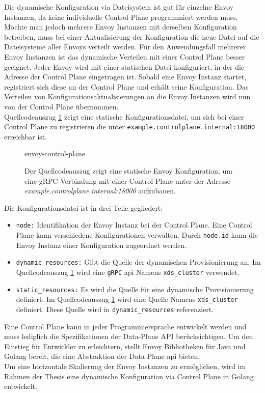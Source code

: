 Die dynamische Konfiguration via Dateisystem ist gut für einzelne Envoy Instanzen, da keine individuelle Control Plane programmiert werden muss.
Möchte man jedoch mehrere Envoy Instanzen mit derselben Konfiguration betreiben, muss bei einer Aktualisierung der Konfiguration die neue Datei auf die Dateisysteme aller Envoys verteilt werden.
Für den Anwendungsfall mehrerer Envoy Instanzen ist das dynamische Verteilen mit einer Control Plane besser geeignet. Jeder Envoy wird mit einer statischen Datei konfiguriert, in der die Adresse der Control Plane eingetragen ist. Sobald eine Envoy Instanz startet, registriert sich diese an der Control Plane und erhält seine Konfiguration. Das Verteilen von Konfigurationsaktualisierungen an die Envoy Instanzen wird nun von der Control Plane übernommen.
\\
Quellcodeauszug \ref{code:envoy-control-plane} zeigt eine statische Konfigurationsdatei, um sich bei einer Control Plane zu registrieren die unter \verb|example.controlplane.internal:18000| erreichbar ist.
\begin{figure}
    {envoy-control-plane}
    \caption{Der Quellcodeauszug zeigt eine statische Envoy Konfiguration, um eine gRPC Verbindung mit einer Control Plane unter der Adresse \textit{example.controlplane.internal:18000} aufzubauen.}
    \label{code:envoy-control-plane}
\end{figure}
Die Konfigurationsdatei ist in drei Teile gegliedert:
\begin{itemize}
  \item \verb|node:| Identifikation der Envoy Instanz bei der Control Plane. Eine Control Plane kann verschiedene Konfigurationen verwalten. Durch \verb|node.id| kann die Envoy Instanz einer Konfiguration zugeordnet werden.
  \item \verb|dynamic_resources:| Gibt die Quelle der dynamischen Provisionierung an. Im Quellcodeauszug \ref{code:envoy-control-plane} wird eine \verb|gRPC| \ac{api} Namens \verb|xds_cluster| verwendet.
  \item \verb|static_resources:| Es wird die Quelle für eine dynamische Provisionierung definiert. Im Quellcodeauszug \ref{code:envoy-control-plane} wird eine Quelle Namens \verb|xds_cluster| definiert. Diese Quelle wird in \verb|dynamic_resources| referenziert.
\end{itemize}
Eine Control Plane kann in jeder Programmiersprache entwickelt werden und muss lediglich die Spezifikationen der Data-Plane API \cite{EnvoyproxyDataplaneapi2021} berücksichtigen. Um den Einstieg für Entwickler zu erleichtern, stellt Envoy Bibliotheken für Java und Golang bereit, die eine Abstraktion der Data-Plane \ac{api} bieten.
\\
Um eine horizontale Skalierung der Envoy Instanzen zu ermöglichen, wird im Rahmen der Thesis eine dynamische Konfiguration via Control Plane in Golang entwickelt.

